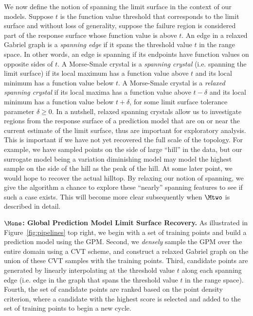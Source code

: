 We now define the notion of spanning the limit surface in the context of our models.
%
Suppose $t$ is the function value threshold that corresponds to the limit surface and without loss of generality, suppose the failure region is considered part of the response surface whose function value is above $t$.
%
An edge in a relaxed Gabriel graph is a \emph{spanning edge} if it spans the threshold value $t$ in the range space.
%
In other words, an edge is spanning if its endpoints have function values on opposite sides of $t$.
%
A Morse-Smale crystal is a \emph{spanning crystal} (i.e. spanning the limit surface) if its local maximum has a function value above $t$ and its local minimum has a function value below $t$.
%
A Morse-Smale crystal is a \emph{relaxed spanning crystal} if its local maxima has a function value above $t-\delta$ and its local minimum has a function value below $t+\delta$, for some limit surface tolerance parameter $\delta \geq 0$.
%
In a nutshell, relaxed spanning crystals allow us to investigate regions from the response surface of a prediction model that are on or near the current estimate of the limit surface, thus are important for exploratory analysis.
%
This is important if we have not yet recovered the full scale of the topology.
%
For example, we have sampled points on the side of large ``hill'' in the data, but our surrogate model being a variation diminishing model may model the highest sample on the side of the hill as the peak of the hill.
%
At some later point, we would hope to recover the actual hilltop.
%
By relaxing our notion of spanning, we give the algorithm a chance to explore these ``nearly'' spanning features to see if such a case exists.
%
This will become more clear subsequently when $\Mtwo$ is described in detail.

\noindent\textbf{$\Mone$: Global Prediction Model Limit Surface Recovery.}
As illustrated in Figure~\ref{fig:pipelines} top right, we begin with a set of training points and build a prediction model using the GPM.
%
Second, we \emph{densely} sample the GPM over the entire domain using a CVT scheme, and construct a relaxed Gabriel graph on the union of these CVT samples with the training points.
%
Third, candidate points are generated by linearly interpolating at the threshold value $t$ along each spanning edge (i.e. edge in the graph that spans the threshold value $t$ in the range space).
%
Fourth, the set of candidate points are ranked based on the point density criterion, where a candidate with the highest score is selected and added to the set of training points to begin a new cycle.


